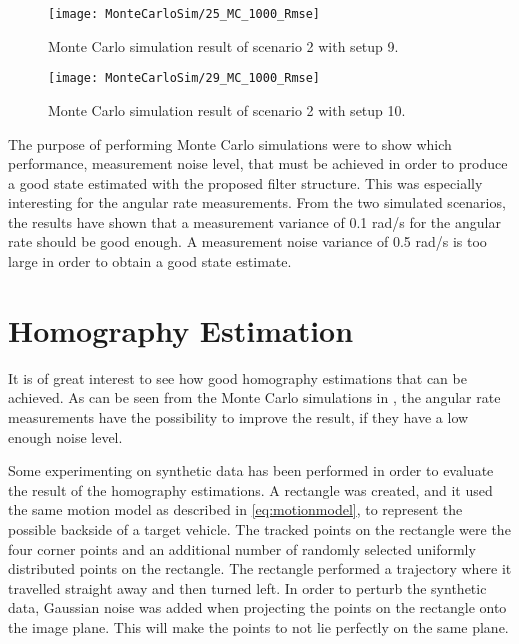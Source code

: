 \begin{figure}[!ht]
	\centering
	\texttt{[image: MonteCarloSim/25\_MC\_1000\_Rmse]}
	\caption{\label{fig:25montesimcrossingroiangvelrmse} Monte Carlo simulation result of scenario 2 with setup 9.}
\end{figure}

\begin{figure}[!ht]
	\centering
	\texttt{[image: MonteCarloSim/29\_MC\_1000\_Rmse]}
	\caption{\label{fig:29montesimcrossingroiangvelcornerrmse} Monte Carlo simulation result of scenario 2 with setup 10.}
\end{figure}

\newpage

The purpose of performing Monte Carlo simulations were to show which performance, \ie measurement noise level, that must be achieved in order to produce a good state estimated with the proposed filter structure.
This was especially interesting for the angular rate measurements.
From the two simulated scenarios, the results have shown that a measurement variance of 0.1 rad/s for the angular rate should be good enough.
A measurement noise variance of 0.5 rad/s is too large in order to obtain a good state estimate.

\newpage

\section{Homography Estimation}
\label{sec:homographyestimationresults}
It is of great interest to see how good homography estimations that can be achieved.
As can be seen from the Monte Carlo simulations in , the angular rate measurements have the possibility to improve the result, if they have a low enough noise level.

Some experimenting on synthetic data has been performed in order to evaluate the result of the homography estimations.
A rectangle was created, and it used the same motion model as described in \eqref{eq:motionmodel}, to represent the possible backside of a target vehicle.
The tracked points on the rectangle were the four corner points and an additional number of randomly selected uniformly distributed points on the rectangle.
The rectangle performed a trajectory where it travelled straight away and then turned left.
In order to perturb the synthetic data, Gaussian noise was added when projecting the points on the rectangle onto the image plane.
This will make the points to not lie perfectly on the same plane.

